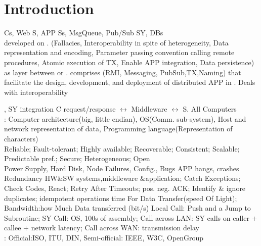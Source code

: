 \section{Introduction}
Cs, Web S, APP Ss, MsgQueue, Pub/Sub SY, DBs 
\\ 
 developed on .
(Fallacies,
Interoperability in spite of heterogeneity,
Data representation and encoding,
Parameter passing convention calling remote procedures,
Atomic execution of TX,
Enable APP integration,
Data persistence)
\\
 as layer between 
or . 
comprises (RMI, Messaging, PubSub,TX,Naming) that facilitate the
design, development, and deployment of distributed APP in
.
Deals with interoperability
\begin{CJK*}{UTF8}{gbsn}
\end{CJK*}, SY integration
\textbar 
C request/response $\leftrightarrow$ Middleware $\leftrightarrow$ S. 
\textbar
All Computers 
\\
:
Computer architecture(big, little endian), 
OS(Comm. sub-system), 
Host and network representation of data, 
Programming language(Representation of characters)
\\
Reliable; 
Fault-tolerant; 
Highly available; 
Recoverable; 
Consistent; 
Scalable; 
Predictable pref.; 
Secure; 
Heterogeneous; 
Open
\\
Power Supply, Hard Disk, Node Failures, Config., Bugs
APP hangs, crashes 
Redundancy HW\&SW systems,middleware \&application; 
Catch Exceptions; 
Check Codes, React; 
Retry After Timeouts;
pos. neg. ACK; 
Identify \& ignore duplicates; 
idempotent operations
time For Data Transfer(speed Of Light); 
Bandwidth:how Much Data transferred (bit/s)
\textbar
Local Call: Push and a Jump to Subroutine;
SY Call: OS, 100s of assembly;
Call across LAN: SY calls on caller $+$ callee $+$ network latency;
Call across WAN: transmission delay
\\
: Official:ISO, ITU, DIN, Semi-official: IEEE, W3C, OpenGroup